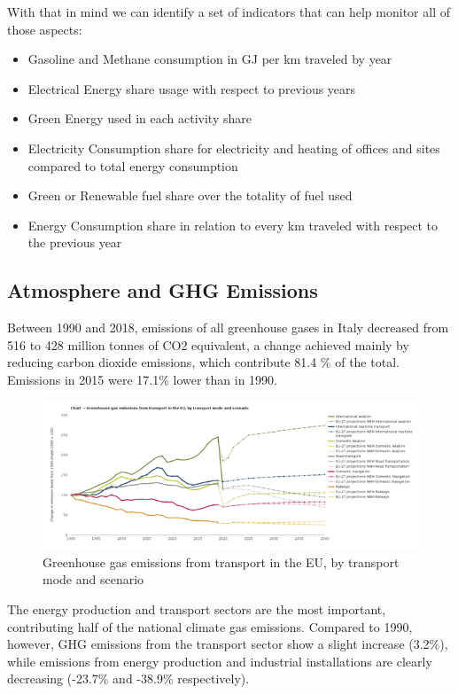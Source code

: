 With that in mind we can identify a set of indicators that can help monitor all of those aspects:
\begin{itemize}
    \item Gasoline and Methane consumption in GJ per km traveled by year
    \item Electrical Energy share usage with respect to previous years
    \item Green Energy used in each activity share
    \item Electricity Consumption share for electricity and heating of offices and sites compared to total energy consumption
    \item Green or Renewable fuel share over the totality of fuel used
    \item Energy Consumption share in relation to every km traveled with respect to the previous year
\end{itemize}

\subsection{Atmosphere and GHG Emissions}
\label{subsec:ghgemissions}
Between 1990 and 2018, emissions of all greenhouse gases in Italy decreased from 516 to 428 million tonnes of CO2 equivalent, a change achieved mainly by reducing carbon dioxide emissions, which contribute 81.4 \% of the total. Emissions in 2015 were 17.1\% lower than in 1990.

\begin{figure}[!ht]
    \centering
    \includegraphics[width=1\textwidth]{Images/Green Sustainability/GHG emission.png}
    \caption{Greenhouse gas emissions from transport in the EU, by transport mode and scenario \cite{GreenhouseScenario}}
    \label{fig:ghgemissions}
\end{figure}

The energy production and transport sectors are the most important, contributing half of the national climate gas emissions. Compared to 1990, however, GHG emissions from the transport sector show a slight increase (3.2\%), while emissions from energy production and industrial installations are clearly decreasing (-23.7\% and -38.9\% respectively).


